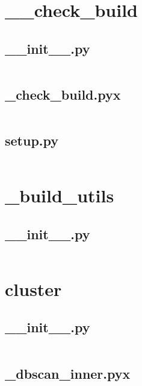 \documentclass{article}
\begin{document}
\section{\_\_check\_build}

\subsection{\_\_init\_\_.py}
\inputminted{python}{/home/dufferzafar/dev/@clones/scikit-learn/sklearn/__check_build/__init__.py}
\newpage

\subsection{\_check\_build.pyx}
\inputminted{cython}{/home/dufferzafar/dev/@clones/scikit-learn/sklearn/__check_build/_check_build.pyx}
\newpage

\subsection{setup.py}
\inputminted{python}{/home/dufferzafar/dev/@clones/scikit-learn/sklearn/__check_build/setup.py}
\newpage

\section{\_build\_utils}

\subsection{\_\_init\_\_.py}
\inputminted{python}{/home/dufferzafar/dev/@clones/scikit-learn/sklearn/_build_utils/__init__.py}
\newpage

\section{cluster}

\subsection{\_\_init\_\_.py}
\inputminted{python}{/home/dufferzafar/dev/@clones/scikit-learn/sklearn/cluster/__init__.py}
\newpage

\subsection{\_dbscan\_inner.pyx}
\inputminted{cython}{/home/dufferzafar/dev/@clones/scikit-learn/sklearn/cluster/_dbscan_inner.pyx}
\newpage
\end{document}
